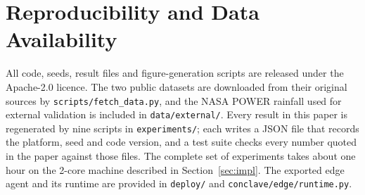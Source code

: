 \documentclass[journal]{IEEEtran}
\begin{document}
\section*{Reproducibility and Data Availability}
All code, seeds, result files and figure-generation scripts are released under
the Apache-2.0 licence. The two public datasets are downloaded from their
original sources by \texttt{scripts/fetch\_data.py}, and the NASA POWER
rainfall used for external validation is included in
\texttt{data/external/}. Every result in this paper
is regenerated by nine scripts in \texttt{experiments/}; each writes a JSON
file that records the platform, seed and code version, and a test suite checks
every number quoted in the paper against those files. The complete set of
experiments takes about one hour on the 2-core machine described in
Section~\ref{sec:impl}. The
exported edge agent and its runtime are provided in \texttt{deploy/} and
\texttt{conclave/edge/runtime.py}.



\end{document}
